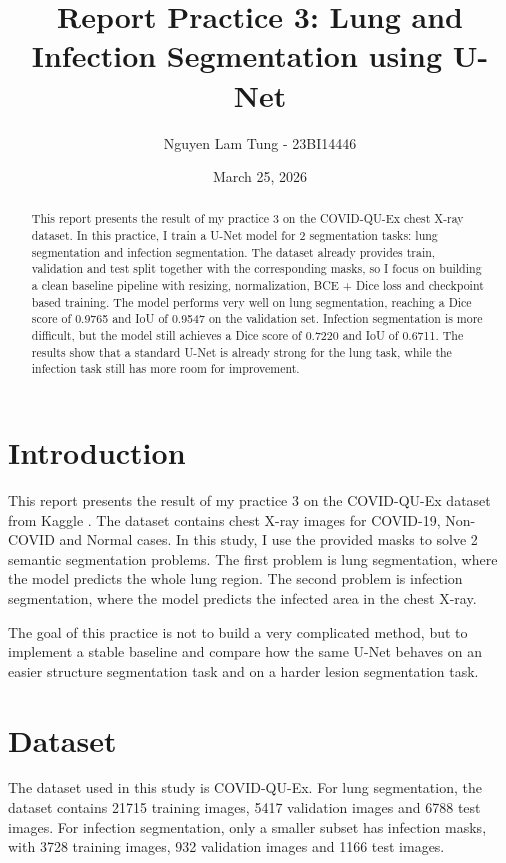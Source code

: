 \documentclass[conference]{IEEEtran}
\title{Report Practice 3: Lung and Infection Segmentation using U-Net}
\author{Nguyen Lam Tung - 23BI14446}
\date{March 25, 2026}
\begin{document}
\maketitle

\begin{abstract}
This report presents the result of my practice 3 on the COVID-QU-Ex chest X-ray dataset. In this practice, I train a U-Net model for 2 segmentation tasks: lung segmentation and infection segmentation. The dataset already provides train, validation and test split together with the corresponding masks, so I focus on building a clean baseline pipeline with resizing, normalization, BCE + Dice loss and checkpoint based training. The model performs very well on lung segmentation, reaching a Dice score of 0.9765 and IoU of 0.9547 on the validation set. Infection segmentation is more difficult, but the model still achieves a Dice score of 0.7220 and IoU of 0.6711. The results show that a standard U-Net is already strong for the lung task, while the infection task still has more room for improvement.

\end{abstract}

\section{Introduction}

This report presents the result of my practice 3 on the COVID-QU-Ex dataset from Kaggle \cite{tahir2021infection,covidqu_kaggle}. The dataset contains chest X-ray images for COVID-19, Non-COVID and Normal cases. In this study, I use the provided masks to solve 2 semantic segmentation problems. The first problem is lung segmentation, where the model predicts the whole lung region. The second problem is infection segmentation, where the model predicts the infected area in the chest X-ray.

The goal of this practice is not to build a very complicated method, but to implement a stable baseline and compare how the same U-Net behaves on an easier structure segmentation task and on a harder lesion segmentation task.

\section{Dataset}

The dataset used in this study is COVID-QU-Ex. For lung segmentation, the dataset contains 21715 training images, 5417 validation images and 6788 test images. For infection segmentation, only a smaller subset has infection masks, with 3728 training images, 932 validation images and 1166 test images.
\end{document}
